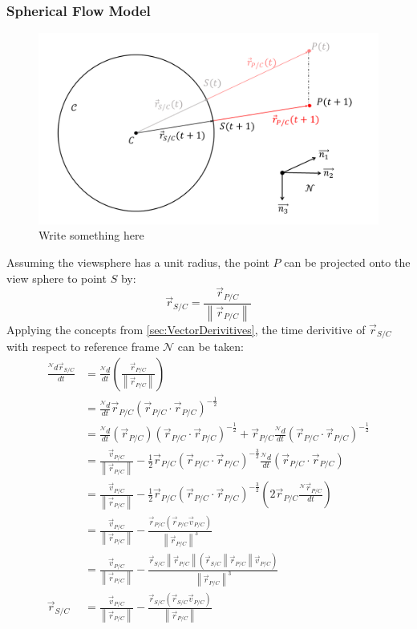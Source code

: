 \documentclass{UoNMCHA}
\newcommand{\norm}[1]{\left\lVert#1\right\rVert}
\numberwithin{equation}{section}
\begin{document}
\subsubsection{Spherical Flow Model}\label{sec:SphericalFlow}
\begin{figure}[ht]
    \begin{center}
        \includegraphics[width=.8\linewidth]{Figures/MeasurementModel}
        \caption{Write something here}
        \label{fig:MeasurementModel}
    \end{center}
\end{figure}
Assuming the viewsphere has a unit radius, the point $P$ can be projected onto the view sphere to point $S$ by:
\begin{equation}
	\vec{r}_{S/C} = \frac{\vec{r}_{P/C}}{\norm{\vec{r}_{P/C}}}
\end{equation}
Applying the concepts from \ref{sec:VectorDerivitives}, the time derivitive of $\vec{r}_{S/C}$ with respect to reference frame $\mathcal{N}$ can be taken: 
\begin{equation}
	\begin{split}
		\frac{{}^\mathcal{N}d\vec{r}_{S/C}}{dt} &= \frac{{}^\mathcal{N}d}{dt}\left(\frac{\vec{r}_{P/C}}{\norm{\vec{r}_{P/C}}}\right)\\
		&= \frac{{}^\mathcal{N}d}{dt}\vec{r}_{P/C}(\vec{r}_{P/C} \cdot \vec{r}_{P/C})^{-\frac{1}{2}}\\
		&=\frac{{}^\mathcal{N}d}{dt}\left(\vec{r}_{P/C}\right)(\vec{r}_{P/C} \cdot \vec{r}_{P/C})^{-\frac{1}{2}} + \vec{r}_{P/C}\frac{{}^\mathcal{N}d}{dt}(\vec{r}_{P/C} \cdot \vec{r}_{P/C})^{-\frac{1}{2}}\\
		&=\frac{\vec{v}_{P/C}}{\norm{\vec{r}_{P/C}}} - \frac{1}{2} \vec{r}_{P/C}(\vec{r}_{P/C}\cdot\vec{r}_{P/C})^{-\frac{3}{2}}\frac{{}^\mathcal{N}d}{dt}(\vec{r}_{P/C} \cdot \vec{r}_{P/C})\\
		&=\frac{\vec{v}_{P/C}}{\norm{\vec{r}_{P/C}}} - \frac{1}{2} \vec{r}_{P/C}(\vec{r}_{P/C}\cdot\vec{r}_{P/C})^{-\frac{3}{2}}\left(2\vec{r}_{P/C}\frac{{}^\mathcal{N}\vec{r}_{P/C}}{dt}\right)\\
		&=\frac{\vec{v}_{P/C}}{\norm{\vec{r}_{P/C}}} - \frac{\vec{r}_{P/C}(\vec{r}_{P/C}\vec{v}_{P/C})}{\norm{\vec{r}_{P/C}}^{3}}\\
		&=\frac{\vec{v}_{P/C}}{\norm{\vec{r}_{P/C}}} - \frac{\vec{r}_{S/C}\norm{\vec{r}_{P/C}}(\vec{r}_{S/C}\norm{\vec{r}_{P/C}}\vec{v}_{P/C})}{\norm{\vec{r}_{P/C}}^{3}}\\
		\vec{r}_{S/C}&=\frac{\vec{v}_{P/C}}{\norm{\vec{r}_{P/C}}} - \frac{\vec{r}_{S/C}(\vec{r}_{S/C}\vec{v}_{P/C})}{\norm{\vec{r}_{P/C}}}
	\end{split}
\end{equation}
\end{document}
